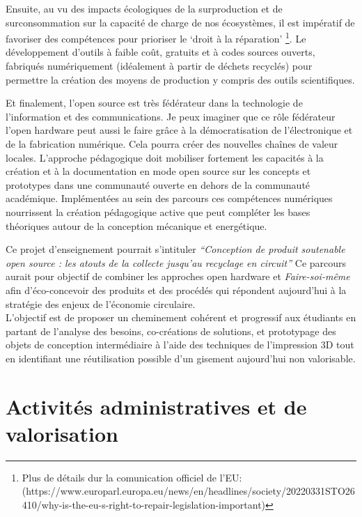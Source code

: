\documentclass[
  11pt,
]{article}
\begin{document}
Ensuite, au vu des impacts écologiques de la surproduction et de
surconsommation sur la capacité de charge de nos écosystèmes, il est
impératif de favoriser des compétences pour prioriser le `droit à la
réparation' \footnote{Plus de détails dur la comunication officiel de
  l'EU:
  (https://www.europarl.europa.eu/news/en/headlines/society/20220331STO26410/why-is-the-eu-s-right-to-repair-legislation-important)}.
Le développement d'outils à faible coût, gratuits et à codes sources
ouverts, fabriqués numériquement (idéalement à partir de déchets
recyclés) pour permettre la création des moyens de production y compris
des outils scientifiques.

Et finalement, l'open source est très fédérateur dans la technologie de
l'information et des communications. Je peux imaginer que ce rôle
fédérateur l'open hardware peut aussi le faire grâce à la
démocratisation de l'électronique et de la fabrication numérique. Cela
pourra créer des nouvelles chaînes de valeur locales. L'approche
pédagogique doit mobiliser fortement les capacités à la création et à la
documentation en mode open source sur les concepts et prototypes dans
une communauté ouverte en dehors de la communauté académique.
Implémentées au sein des parcours ces compétences numériques nourrissent
la création pédagogique active que peut compléter les bases théoriques
autour de la conception mécanique et energétique.

Ce projet d'enseignement pourrait s'intituler \emph{``Conception de
produit soutenable open source : les atouts de la collecte jusqu'au
recyclage en circuit''} Ce parcours aurait pour objectif de combiner les
approches open hardware et \emph{Faire-soi-même} afin d'éco-concevoir
des produits et des procédés qui répondent aujourd'hui à la stratégie
des enjeux de l'économie circulaire.\\
L'objectif est de proposer un cheminement cohérent et progressif aux
étudiants en partant de l'analyse des besoins, co-créations de
solutions, et prototypage des objets de conception intermédiaire à
l'aide des techniques de l'impression 3D tout en identifiant une
réutilisation possible d'un gisement aujourd'hui non valorisable.

\hypertarget{activituxe9s-administratives-et-de-valorisation}{%
\section{Activités administratives et de
valorisation}\label{activituxe9s-administratives-et-de-valorisation}}
\end{document}

